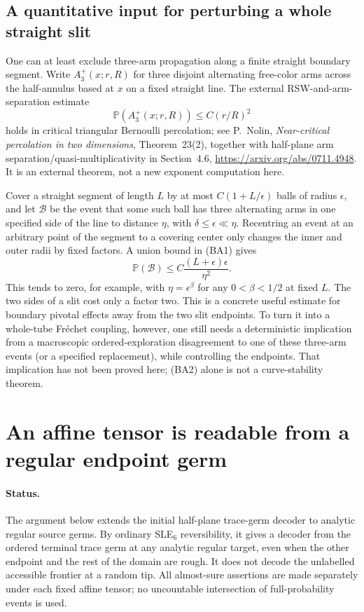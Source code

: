 \documentclass[11pt]{article}
\theoremstyle{definition}\newtheorem{definition}[theorem]{Definition}
\theoremstyle{remark}\newtheorem{remark}[theorem]{Remark}
\begin{document}
\subsection{A quantitative input for perturbing a whole straight slit}

One can at least exclude three-arm propagation along a finite straight
boundary segment. Write $A_3^+(x;r,R)$ for three disjoint alternating
free-color arms across the half-annulus based at $x$ on a fixed straight
line. The external RSW-and-arm-separation estimate
\[
 \mathbb P(A_3^+(x;r,R))\le C(r/R)^2
 \tag{BA1}
\]
holds in critical triangular Bernoulli percolation; see P.~Nolin,
\emph{Near-critical percolation in two dimensions}, Theorem~23(2),
together with half-plane arm separation/quasi-multiplicativity in
Section~4.6, \url{https://arxiv.org/abs/0711.4948}.
It is an external theorem, not a new exponent computation here.

Cover a straight segment of length $L$ by at most $C(1+L/\epsilon)$
balls of radius $\epsilon$, and let $\mathcal B$ be the event that some
such ball has three alternating arms in one specified side of the line
to distance $\eta$, with $\delta\le\epsilon\ll\eta$. Recentring an
event at an arbitrary point of the segment to a covering center only
changes the inner and outer radii by fixed factors. A union bound in
(BA1) gives
\[
 \mathbb P(\mathcal B)
 \le C\frac{(L+\epsilon)\epsilon}{\eta^2}.
 \tag{BA2}
\]
This tends to zero, for example, with $\eta=\epsilon^\beta$ for any
$0<\beta<1/2$ at fixed $L$. The two sides of a slit cost only a factor
two. This is a concrete useful estimate for boundary pivotal effects
away from the two slit endpoints. To turn it into a whole-tube
Fr\'echet coupling, however, one still needs a deterministic implication
from a macroscopic ordered-exploration disagreement to one of these
three-arm events (or a specified replacement), while controlling the
endpoints. That implication has not been proved here; (BA2) alone is
not a curve-stability theorem.

\section{An affine tensor is readable from a regular endpoint germ}
\label{sec:regular-endpoint-decoder}

\paragraph{Status.}
The argument below extends the initial half-plane trace-germ decoder to
analytic regular source germs. By ordinary SLE$_6$ reversibility, it gives
a decoder from the ordered terminal trace germ at any analytic regular
target, even when the other endpoint and the rest of the domain are rough.
It does not decode the unlabelled accessible frontier at a random tip.
All almost-sure assertions are made separately under each fixed affine
tensor; no uncountable intersection of full-probability events is used.
\end{document}
